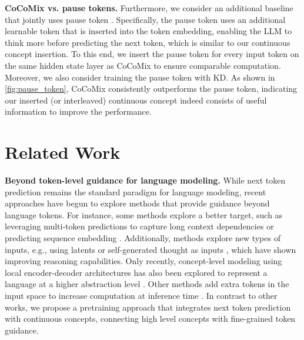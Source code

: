 \documentclass[]{fairmeta}
\newcommand{\sname}{CoCoMix\xspace}
\begin{document}
\textbf{\sname vs. pause tokens.} Furthermore, we consider an additional baseline that jointly uses pause token \citep{goyal2024think}. Specifically, the pause token uses an additional learnable token that is inserted into the token embedding, enabling the LLM to think more before predicting the next token, which is similar to our continuous concept insertion. To this end, we insert the pause token for every input token on the same hidden state layer as \sname to ensure comparable computation. Moreover, we also consider training the pause token with KD. As shown in \autoref{fig:pause_token}, \sname consistently outperforms the pause token, indicating our inserted (or interleaved) continuous concept indeed consists of useful information to improve the performance.

\section{Related Work}
\label{sec:related}

\textbf{Beyond token-level guidance for language modeling.} While next token prediction remains the standard paradigm for language modeling, recent approaches have begun to explore methods that provide guidance beyond language tokens. For instance, some methods explore a better target, such as leveraging multi-token predictions to capture long context dependencies \citep{gloeckle2024better,liu2024deepseek} or predicting sequence embedding \citep{lee2024semiparametric}. Additionally, methods explore new types of inputs, e.g., using latents \citep{hao2024training} or self-generated thought as inputs \citep{zelikman2024quiet}, which have shown improving reasoning capabilities. Only recently, concept-level modeling using local encoder-decoder architectures has also been explored to represent a language at a higher abstraction level \citep{the2024large}. Other methods add extra tokens in the input space to increase computation at inference time \cite{nye2021show,wei2022chain,goyal2024think,lanchantin2024learning}. In contrast to other works, we propose a pretraining approach that integrates next token prediction with continuous concepts, connecting high level concepts with fine-grained token guidance. 
\end{document}

